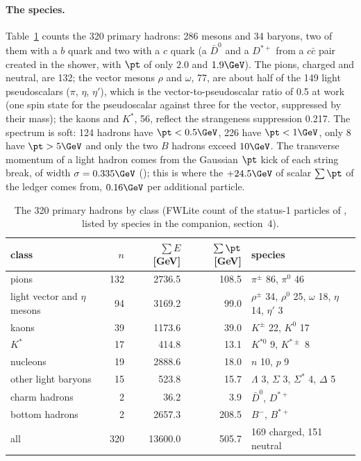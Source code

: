 \paragraph{The species.}
Table~\ref{tab:05species} counts the 320 primary hadrons: 286 mesons and 34 baryons, two of
them with a $b$ quark and two with a $c$ quark (a $\bar D^0$ and a $D^{*+}$ from a $c\bar c$ pair created in the
shower, with $\pt$ of only $2.0$ and $1.9\GeV$). The pions, charged and neutral, are 132; the vector mesons
$\rho$ and $\omega$, 77, are about half of the 149 light pseudoscalars ($\pi$, $\eta$, $\eta'$), which is the
vector-to-pseudoscalar ratio of 0.5 at work (one spin state for the pseudoscalar against three for the vector,
suppressed by their mass); the
kaons and $K^*$, 56, reflect the strangeness suppression 0.217. The spectrum is soft: 124 hadrons have
$\pt<0.5\GeV$, 226 have $\pt<1\GeV$, only 8 have $\pt>5\GeV$ and only the two $B$ hadrons exceed $10\GeV$.
The transverse momentum of a light hadron comes from the Gaussian $\pt$ kick of each string break, of width
$\sigma=0.335\GeV$ (); this is where the $+24.5\GeV$ of scalar $\sum\pt$ of the ledger
comes from, $0.16\GeV$ per additional particle.

\begin{table}[htbp]
\centering\small
\caption{The 320 primary hadrons by class (FWLite count of the status-1 particles of
, listed by species in the companion, section~4).}
\label{tab:05species}
\begin{tabular}{lrrrl}
\toprule
class & $n$ & $\sum E$ [GeV] & $\sum\pt$ [GeV] & species \\
\midrule
pions & 132 & 2736.5 & 108.5 & $\pi^\pm$ 86, $\pi^0$ 46 \\
light vector and $\eta$ mesons & 94 & 3169.2 & 99.0 & $\rho^\pm$ 34, $\rho^0$ 25, $\omega$ 18, $\eta$ 14, $\eta'$ 3 \\
kaons & 39 & 1173.6 & 39.0 & $K^\pm$ 22, $K^0$ 17 \\
$K^*$ & 17 & 414.8 & 13.1 & $K^{*0}$ 9, $K^{*\pm}$ 8 \\
nucleons & 19 & 2888.6 & 18.0 & $n$ 10, $p$ 9 \\
other light baryons & 15 & 523.8 & 15.7 & $\Lambda$ 3, $\Sigma$ 3, $\Sigma^*$ 4, $\Delta$ 5 \\
charm hadrons & 2 & 36.2 & 3.9 & $\bar D^0$, $D^{*+}$ \\
bottom hadrons & 2 & 2657.3 & 208.5 & $B^-$, $B^{*+}$ \\
\midrule
all & 320 & 13600.0 & 505.7 & 169 charged, 151 neutral \\
\bottomrule
\end{tabular}
\end{table}


